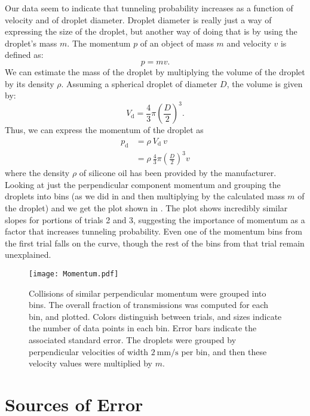 Our data seem to indicate that tunneling probability increases as a function of velocity and of droplet diameter. Droplet diameter is really just a way of expressing the size of the droplet, but another way of doing that is by using the droplet's mass $m$. The momentum $p$ of an object of mass $m$ and velocity $v$ is defined as:
$$p = mv.$$
We can estimate the mass of the droplet by multiplying the volume of the droplet by its density $\rho$. Assuming a spherical droplet of diameter $D$, the volume is given by:
$$V_\mathrm{d} = \frac{4}{3}\pi \left(\frac{D}{2}\right)^3.$$
Thus, we can express the momentum of the droplet as
\begin{align}
p_\mathrm{d} &= \rho~V_\mathrm{d}~v \\
& = \rho~\frac{4}{3}\pi \left(\frac{D}{2}\right)^3 v
\end{align}
where the density $\rho$ of silicone oil has been provided by the manufacturer. Looking at just the perpendicular component momentum and grouping the droplets into bins (as we did in  and then multiplying by the calculated mass $m$ of the droplet) and we get the plot shown in . The plot shows incredibly similar slopes for portions of trials 2 and 3, suggesting the importance of momentum as a factor that increases tunneling probability. Even one of the momentum bins from the first trial falls on the curve, though the rest of the bins from that trial remain unexplained. 

\begin{figure}[h!]
	\centering
	\texttt{[image: Momentum.pdf]}
	\caption{Collisions of similar perpendicular momentum were grouped into bins. The overall fraction of transmissions was computed for each bin, and plotted. Colors distinguish between trials, and sizes indicate the number of data points in each bin. Error bars indicate the associated standard error. The droplets were grouped by perpendicular velocities of width $2~\mathrm{mm/s}$ per bin, and then these velocity values were multiplied by $m$. }
	\label{fig:mom}
\end{figure}




\section{Sources of Error}
\label{sect:error}

